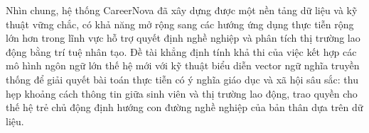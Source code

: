 Nhìn chung, hệ thống CareerNova đã xây dựng được một nền tảng dữ liệu và kỹ thuật vững chắc, có khả năng mở rộng sang các hướng ứng dụng thực tiễn rộng lớn hơn trong lĩnh vực hỗ trợ quyết định nghề nghiệp và phân tích thị trường lao động bằng trí tuệ nhân tạo. Đề tài khẳng định tính khả thi của việc kết hợp các mô hình ngôn ngữ lớn thế hệ mới với kỹ thuật biểu diễn vector ngữ nghĩa truyền thống để giải quyết bài toán thực tiễn có ý nghĩa giáo dục và xã hội sâu sắc: thu hẹp khoảng cách thông tin giữa sinh viên và thị trường lao động, trao quyền cho thế hệ trẻ chủ động định hướng con đường nghề nghiệp của bản thân dựa trên dữ liệu.
